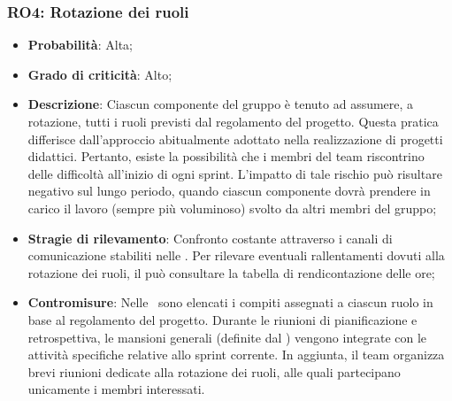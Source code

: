 \subsubsection{RO4: Rotazione dei ruoli}
\begin{itemize}
    \item \textbf{Probabilità}: Alta;
    \item \textbf{Grado di criticità}: Alto;
    \item \textbf{Descrizione}: Ciascun componente del gruppo è tenuto ad assumere, a rotazione, tutti i ruoli previsti dal regolamento del progetto. Questa pratica differisce dall'approccio abitualmente adottato nella realizzazione di progetti didattici. Pertanto, esiste la possibilità che i membri del team riscontrino delle difficoltà all’inizio di ogni sprint. L’impatto di tale rischio può risultare negativo sul lungo periodo, quando ciascun componente dovrà prendere in carico il lavoro (sempre più voluminoso) svolto da altri membri del gruppo;
    \item \textbf{Stragie di rilevamento}: Confronto costante attraverso i canali di comunicazione stabiliti nelle \NdP. Per rilevare eventuali rallentamenti dovuti alla rotazione dei ruoli, il \Responsabile{} può consultare la tabella di rendicontazione delle ore;
    \item \textbf{Contromisure}: Nelle \NdP\ sono elencati i compiti assegnati a ciascun ruolo in base al regolamento del progetto. Durante le riunioni di pianificazione e retrospettiva, le mansioni generali (definite dal \WoW) vengono integrate con le attività specifiche relative allo sprint corrente. In aggiunta, il team organizza brevi riunioni dedicate alla rotazione dei ruoli, alle quali partecipano unicamente i membri interessati.
\end{itemize}
